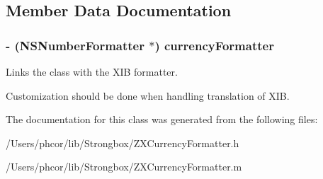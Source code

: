 \subsection{Member Data Documentation}
\hypertarget{interface_z_x_currency_formatter_d9a4bf6ab9a16ee88ea1aadf33ca02f5}{
\subsubsection[{currencyFormatter}]{\setlength{\rightskip}{0pt plus 5cm}- (NSNumberFormatter $\ast$) {\bf currencyFormatter}}}
\label{interface_z_x_currency_formatter_d9a4bf6ab9a16ee88ea1aadf33ca02f5}


Links the class with the XIB formatter. 

Customization should be done when handling translation of XIB. 

The documentation for this class was generated from the following files:\begin{CompactItemize}
\item 
/Users/phcor/lib/Strongbox/ZXCurrencyFormatter.h\item 
/Users/phcor/lib/Strongbox/ZXCurrencyFormatter.m\end{CompactItemize}
